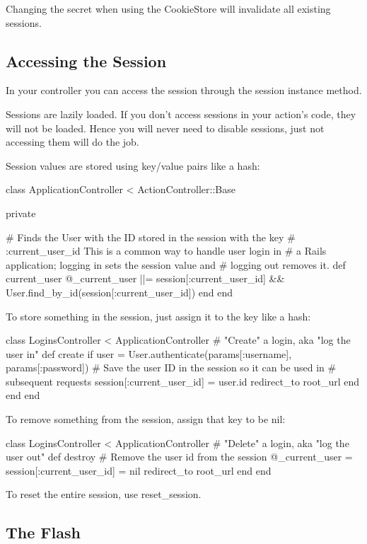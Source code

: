 \documentclass[10pt]{book}
\newenvironment{code}{%
  \scriptsize
    \verbatim
}{%
    \endverbatim
    \newline
}
\begin{document}
Changing the secret when using the CookieStore will invalidate all existing sessions.

\subsection{ Accessing the Session}

In your controller you can access the session through the session instance method.

Sessions are lazily loaded. If you don’t access  sessions in your action’s code, they will not be loaded. Hence you will  never need to disable sessions, just not accessing them will do the job.

Session values are stored using key/value pairs like a hash:
\begin{code}
class ApplicationController < ActionController::Base
 
  private
 
  # Finds the User with the ID stored in the session with the key
  # :current_user_id This is a common way to handle user login in
  # a Rails application; logging in sets the session value and
  # logging out removes it.
  def current_user
    @_current_user ||= session[:current_user_id] &&
      User.find_by_id(session[:current_user_id])
  end
end
\end{code}

To store something in the session, just assign it to the key like a hash:
\begin{code}
class LoginsController < ApplicationController
  # "Create" a login, aka "log the user in"
  def create
    if user = User.authenticate(params[:username], params[:password])
      # Save the user ID in the session so it can be used in
      # subsequent requests
      session[:current_user_id] = user.id
      redirect_to root_url
    end
  end
end
\end{code}

To remove something from the session, assign that key to be nil:
\begin{code}
class LoginsController < ApplicationController
  # "Delete" a login, aka "log the user out"
  def destroy
    # Remove the user id from the session
    @_current_user = session[:current_user_id] = nil
    redirect_to root_url
  end
end
\end{code}

To reset the entire session, use reset\_session.

\subsection{ The Flash}
\end{document}
